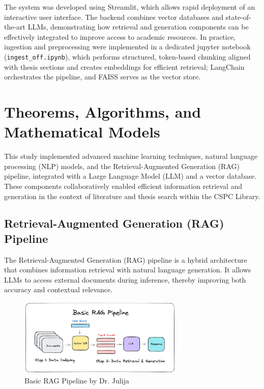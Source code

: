 \begin{refsection}
The system was developed using Streamlit, which allows rapid deployment of an interactive user interface. The backend combines vector databases and state-of-the-art LLMs, demonstrating how retrieval and generation components can be effectively integrated to improve access to academic resources. In practice, ingestion and preprocessing were implemented in a dedicated jupyter notebook (\texttt{ingest\_off.ipynb}), which performs structured, token-based chunking aligned with thesis sections and creates embeddings for efficient retrieval; LangChain orchestrates the pipeline, and FAISS serves as the vector store.

\section{Theorems, Algorithms, and Mathematical Models}

This study implemented advanced machine learning techniques, natural language processing (NLP) models, and the Retrieval-Augmented Generation (RAG) pipeline, integrated with a Large Language Model (LLM) and a vector database. These components collaboratively enabled efficient information retrieval and generation in the context of literature and thesis search within the CSPC Library.


\subsection{Retrieval-Augmented Generation (RAG) Pipeline}

The Retrieval-Augmented Generation (RAG) pipeline is a hybrid architecture that combines information retrieval with natural language generation. It allows LLMs to access external documents during inference, thereby improving both accuracy and contextual relevance.

\begin{figure}[htbp]
    \centering
    \includegraphics[width=0.7\textwidth]{figures/rag.png}
    \caption{Basic RAG Pipeline by Dr. Julija}
    \label{fig:rag}
\end{figure}


\end{refsection}
